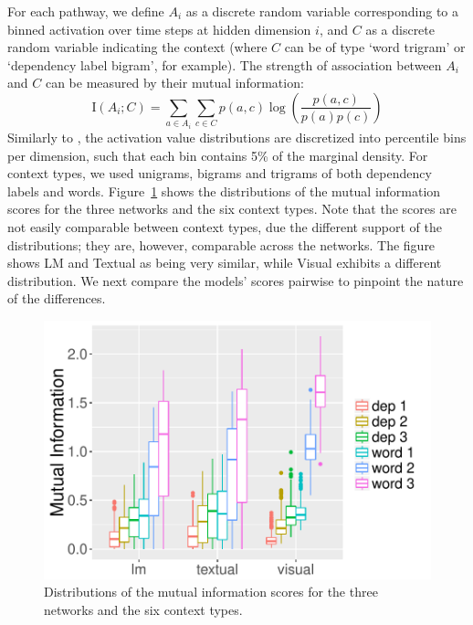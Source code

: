 For each pathway, we define $A_i$ as a discrete random variable corresponding 
to a binned activation over time steps at hidden dimension $i$, and $C$ 
as a discrete random variable indicating the context 
(where $C$ can be of type `word trigram' or `dependency label bigram', for example). 
The strength of association between $A_i$ and $C$ can be measured 
by their mutual information:
\[
\mathrm{I}(A_i;C) = \sum_{a\in{A_i}}\sum_{c\in{C}} p(a,c)\log\left(\frac{p(a,c)}{p(a)p(c)}\right) 
\]
Similarly to , the activation value
distributions are discretized into percentile bins per dimension, such
that each bin contains 5\% of the marginal density. For context types,
we used unigrams, bigrams and trigrams of both dependency labels and
words. Figure~\ref{fig:raw_mutual} shows the distributions of the
mutual information scores for the three networks and the six context
types. Note that the scores are not easily comparable between context
types, due the different support of the distributions; they are,
however, comparable across the networks. The figure shows {\sc LM} and
{\sc Textual} as being very similar, while {\sc Visual} exhibits a
different distribution. We next compare the models' scores pairwise to
pinpoint the nature of the differences.
\begin{figure}
  \centering
  \includegraphics[scale=0.6]{raw_mutual.pdf}
  \caption{Distributions of the mutual information scores for the three networks and the six context types.}
  \label{fig:raw_mutual}
\end{figure}

